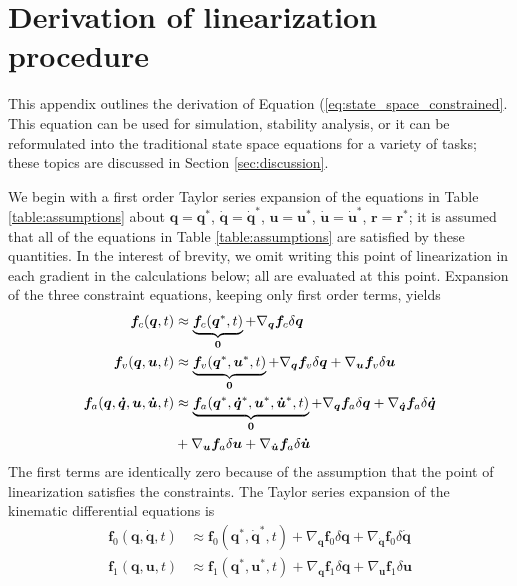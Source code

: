 \documentclass[smallcondensed]{svjour3}                     %
\begin{document}
\appendix
\section{Derivation of linearization procedure}
\label{sec:derivations}

This appendix outlines the derivation of Equation
(\ref{eq:state_space_constrained}. This equation can be used for simulation,
stability analysis, or it can be reformulated into the traditional state space
equations for a variety of tasks; these topics are discussed in Section
\ref{sec:discussion}.

We begin with a first order Taylor series expansion of the equations in Table
\ref{table:assumptions} about $\bm{q}=\bm{q}^*$, $\bm{\dot{q}}=\bm{\dot{q}}^*$,
$\bm{u}=\bm{u}^*$, $\bm{\dot{u}}=\bm{\dot{u}}^*$, $\bm{r}=\bm{r}^*$; it is
assumed that all of the equations in Table \ref{table:assumptions} are
satisfied by these quantities.  In the interest of brevity, we omit writing
this point of linearization in each gradient in the calculations below; all are
evaluated at this point.  Expansion of the three constraint
equations, keeping only first order terms, yields
\begin{align}
  \label{eq:configuration_expansion}
  \bm{f}_{c}(\bm{q}, t) &\approx \underbrace{\bm{f}_{c}(\bm{q}^*, t)}_{\bm{0}} +
  \nabla_{\bm{q}}\bm{f}_{c} \delta \bm{q}\\
  \label{eq:velocity_expansion}
  \bm{f}_{v}(\bm{q}, \bm{u}, t) &\approx \underbrace{\bm{f}_{v}(\bm{q}^*,
  \bm{u}^*, t)}_{\bm{0}} +  \nabla_{\bm{q}}\bm{f}_{v} \delta \bm{q} +
  \nabla_{\bm{u}}\bm{f}_{v} \delta \bm{u} \\
  \label{eq:acceleration_expansion}
  \bm{f}_{a}(\bm{q}, \bm{\dot{q}}, \bm{u}, \bm{\dot{u}}, t) &\approx
  \underbrace{\bm{f}_{a}(\bm{q}^*, \bm{\dot{q}}^*, \bm{u}^*, \bm{\dot{u}}^*,
t)}_{\bm{0}} +  \nabla_{\bm{q}}\bm{f}_{a} \delta \bm{q} +
\nabla_{\bm{\dot{q}}}\bm{f}_{a}
 \delta \bm{\dot{q}} \notag\\
&+ \nabla_{\bm{u}}\bm{f}_{a} \delta \bm{u} + \nabla_{\bm{\dot{u}}}\bm{f}_{a}
\delta \bm{\dot{u}}
\end{align}
The first terms are identically zero because of the assumption that the
point of linearization satisfies the constraints.  The Taylor series expansion
of the kinematic differential equations is
\begin{align}
  \label{eq:f0_expansion}
  \bm{f}_{0}(\bm{q}, \bm{\dot{q}}, t) &\approx \bm{f}_{0}(\bm{q}^*,
  \bm{\dot{q}}^*, t) + \nabla_{\bm{q}}\bm{f}_{0} \delta\bm{q} +
  \nabla_{\bm{\dot{q}}}\bm{f}_{0} \delta\bm{\dot{q}}\\
  \label{eq:f1_expansion}
  \bm{f}_{1}(\bm{q}, \bm{u}, t) &\approx \bm{f}_{1}(\bm{q}^*,
  \bm{u}^*, t) + \nabla_{\bm{q}}\bm{f}_{1} \delta\bm{q} +
  \nabla_{\bm{u}}\bm{f}_{1} \delta\bm{u}
\end{align}
\end{document}
